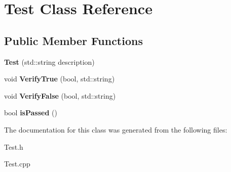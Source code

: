 \hypertarget{classTest}{\section{Test Class Reference}
\label{classTest}
}
\subsection*{Public Member Functions}
\begin{DoxyCompactItemize}
\item 
\hypertarget{classTest_aa1a8488c06a34269437ee3d97819d619}{{\bfseries Test} (std\+::string description)}\label{classTest_aa1a8488c06a34269437ee3d97819d619}

\item 
\hypertarget{classTest_aa7b8f1adb896473e046835503af76c1d}{void {\bfseries Verify\+True} (bool, std\+::string)}\label{classTest_aa7b8f1adb896473e046835503af76c1d}

\item 
\hypertarget{classTest_a719a8eb78ad30689d4b1292d8ed8c6e0}{void {\bfseries Verify\+False} (bool, std\+::string)}\label{classTest_a719a8eb78ad30689d4b1292d8ed8c6e0}

\item 
\hypertarget{classTest_ae10143e79951d45bd6137ed399d7b37a}{bool {\bfseries is\+Passed} ()}\label{classTest_ae10143e79951d45bd6137ed399d7b37a}

\end{DoxyCompactItemize}


The documentation for this class was generated from the following files\+:\begin{DoxyCompactItemize}
\item 
Test.\+h\item 
Test.\+cpp\end{DoxyCompactItemize}
